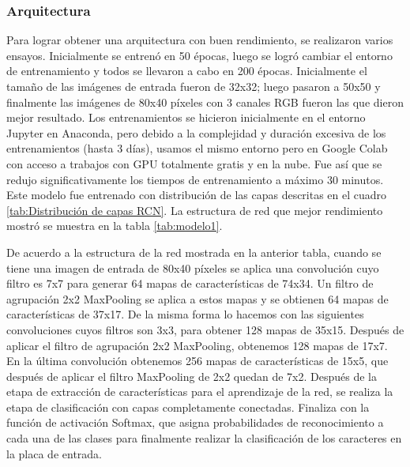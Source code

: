 \subsubsection*{Arquitectura}

Para lograr obtener una arquitectura con buen rendimiento, se realizaron varios ensayos. Inicialmente se entrenó en 50 épocas, luego se logró cambiar el entorno de entrenamiento y todos se llevaron a cabo en 200 épocas. Inicialmente el tamaño de las imágenes de entrada fueron de 32x32; luego pasaron a 50x50 y finalmente las imágenes de 80x40 píxeles con 3 canales RGB fueron las que dieron mejor resultado. Los entrenamientos se hicieron inicialmente en el entorno Jupyter en Anaconda, pero debido a la complejidad y duración excesiva de los entrenamientos (hasta 3 días), usamos el mismo entorno pero en Google Colab con acceso a trabajos con GPU totalmente gratis y en la nube. Fue así que se redujo significativamente los tiempos de entrenamiento a máximo 30 minutos. Este modelo fue entrenado con distribución de las capas descritas en el cuadro \ref{tab:Distribución de capas RCN}. La estructura de red que mejor rendimiento mostró se muestra en la tabla \ref{tab:modelo1}.

De acuerdo a la estructura de la red mostrada en la anterior tabla, cuando se tiene una imagen de entrada de 80x40 píxeles se aplica una convolución cuyo filtro es 7x7 para generar 64 mapas de características de 74x34. Un filtro de agrupación 2x2 MaxPooling se aplica a estos mapas y se obtienen 64 mapas de características de 37x17. De la misma forma lo hacemos con las siguientes convoluciones cuyos filtros son 3x3, para obtener 128 mapas de 35x15. Después de aplicar el filtro de agrupación 2x2 MaxPooling, obtenemos 128 mapas de 17x7. En la última convolución obtenemos 256 mapas de características de 15x5, que después de aplicar el filtro MaxPooling de 2x2 quedan de 7x2. Después de la etapa de extracción de características para el aprendizaje de la red, se realiza la etapa de clasificación con capas completamente conectadas. Finaliza con la función de activación Softmax, que asigna probabilidades de reconocimiento a cada una de las clases para finalmente realizar la clasificación de los caracteres en la placa de entrada.

